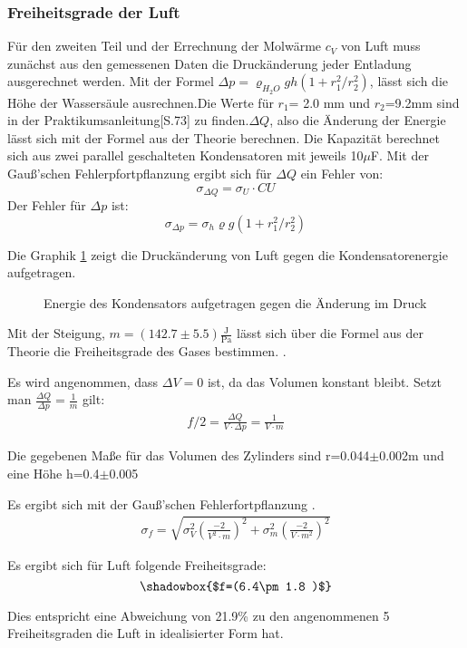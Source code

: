 \documentclass[12pt,a4paper,titlepage,headinclude,bibtotoc]{scrartcl}
\begin{document}
\subsubsection{Freiheitsgrade der Luft}
Für den zweiten Teil und der Errechnung der Molwärme $c_V$ von Luft muss zunächst aus den gemessenen Daten die Druckänderung jeder Entladung ausgerechnet werden. Mit der Formel $\Delta p=\varrho_{H_2O}gh(1+r_1^2 / r_2^2 )$, lässt sich die Höhe der Wassersäule ausrechnen.Die Werte für $r_1$= 2.0 mm und $r_2$=9.2mm sind in der Praktikumsanleitung[S.73] zu finden.$\Delta Q$, also die Änderung der Energie lässt sich mit der Formel aus der Theorie berechnen. Die Kapazität berechnet sich aus zwei parallel geschalteten Kondensatoren mit jeweils 10$\mu$F.
Mit der Gauß'schen Fehlerpfortpflanzung ergibt sich für $\Delta Q$ ein Fehler von:
$$\sigma_{\Delta Q}=\sigma_U \cdot CU$$
Der Fehler für $\Delta p$ ist:
$$\sigma_{\Delta p}=\sigma_h \varrho g \left(1+r_1^2/r_2^2 \right)$$

Die Graphik \ref{fig:druckwarm} zeigt die Druckänderung von Luft gegen die Kondensatorenergie aufgetragen.
\begin{figure}[!h]
\centering

\caption{Energie des Kondensators aufgetragen gegen die Änderung im Druck}
\label{fig:druckwarm}
\end{figure}
Mit der Steigung,
 $m=(142.7\pm5.5)\frac{\text{J}}{\text{Pa}}$ lässt sich über die Formel aus der Theorie  die Freiheitsgrade des Gases bestimmen.
.

Es wird angenommen, dass $\Delta V=0$ ist, da das Volumen konstant bleibt.
Setzt man $\frac{\Delta Q}{\Delta p}=\frac1m$ gilt:
\begin{align}
	f/2= \frac{ \Delta Q}{V\cdot \Delta p}=\frac{1}{V\cdot m}
\end{align}

Die gegebenen Maße für das Volumen des Zylinders sind r=0.044$\pm$0.002m und eine Höhe h=0.4$\pm$0.005



Es ergibt sich mit der Gauß'schen Fehlerfortpflanzung .
\begin{align}
	\sigma_f=\sqrt{\sigma_V^2\left(\frac{-2}{V^2\cdot m}\right)^2+\sigma_m^2\left(\frac{-2}{V\cdot m^2}\right)^2}
\end{align}

Es ergibt sich für Luft folgende Freiheitsgrade:
$$\shadowbox{$f=(6.4\pm1.8 )$}$$

Dies entspricht eine Abweichung von 21.9\% zu den angenommenen 5 Freiheitsgraden die Luft in idealisierter Form hat.
\end{document}
